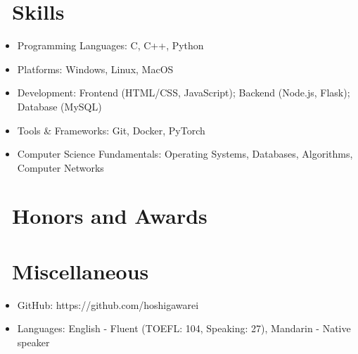 \documentclass{resume}
\begin{document}

\section{\faCogs\ Skills}
\begin{itemize}[parsep=0.5ex]
  \item Programming Languages: C, C++, Python
  \item Platforms: Windows, Linux, MacOS
  \item Development: Frontend (HTML/CSS, JavaScript); Backend (Node.js, Flask); Database (MySQL)
  \item Tools \& Frameworks: Git, Docker, PyTorch
  \item Computer Science Fundamentals: Operating Systems, Databases, Algorithms, Computer Networks
\end{itemize}

\section{\faHeartO\ Honors and Awards}

\section{\faInfo\ Miscellaneous}
\begin{itemize}[parsep=0.5ex]
  \item GitHub: https://github.com/hoshigawarei
  \item Languages: English - Fluent (TOEFL: 104, Speaking: 27), Mandarin - Native speaker
\end{itemize}

%
%
\end{document}
